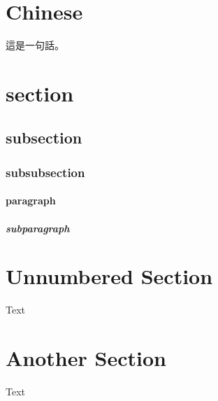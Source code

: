 \documentclass[12pt, a4paper]{article} %
\begin{document}
    \section{Chinese}
        \begin{CJK*}{UTF8}{bkai}
            這是一句話。
        \end{CJK*}

    \section{section}
        \subsection{subsection}
            \subsubsection{subsubsection}
                \paragraph{paragraph}
                    \subparagraph{subparagraph}

    \section*{Unnumbered Section}
        Text

    \section{Another Section}
        Text

    
    
\end{document}
